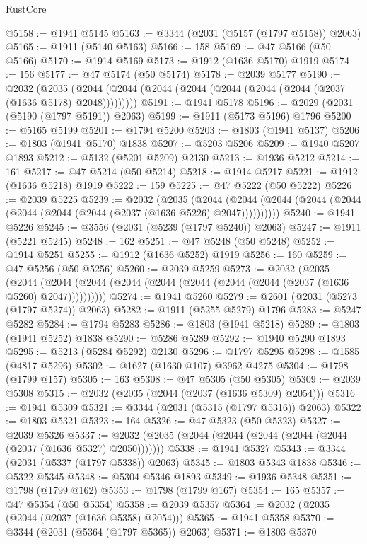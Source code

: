\begin{lexlean}{RustCore}
\begin{coremodule}
@5158 := @1941 @5145
@5163 := @3344 (@2031 (@5157 (@1797 @5158)) @2063)
@5165 := @1911 (@5140 @5163)
@5166 := 158
@5169 := @47 @5166 (@50 @5166)
@5170 := @1914 @5169
@5173 := @1912 (@1636 @5170) @1919
@5174 := 156
@5177 := @47 @5174 (@50 @5174)
@5178 := @2039 @5177
@5190 := @2032
    (@2035 (@2044 (@2044 (@2044 (@2044 (@2044 (@2044 (@2044 (@2037 (@1636 @5178) @2048)))))))))
@5191 := @1941 @5178
@5196 := @2029 (@2031 (@5190 (@1797 @5191)) @2063)
@5199 := @1911 (@5173 @5196) @1796
@5200 := @5165 @5199
@5201 := @1794 @5200
@5203 := @1803 (@1941 @5137)
@5206 := @1803 (@1941 @5170) @1838
@5207 := @5203 @5206
@5209 := @1940 @5207 @1893
@5212 := @5132 (@5201 @5209) @2130
@5213 := @1936 @5212
@5214 := 161
@5217 := @47 @5214 (@50 @5214)
@5218 := @1914 @5217
@5221 := @1912 (@1636 @5218) @1919
@5222 := 159
@5225 := @47 @5222 (@50 @5222)
@5226 := @2039 @5225
@5239 := @2032
    (@2035
      (@2044 (@2044 (@2044 (@2044 (@2044 (@2044 (@2044 (@2044 (@2037 (@1636 @5226) @2047))))))))))
@5240 := @1941 @5226
@5245 := @3556 (@2031 (@5239 (@1797 @5240)) @2063)
@5247 := @1911 (@5221 @5245)
@5248 := 162
@5251 := @47 @5248 (@50 @5248)
@5252 := @1914 @5251
@5255 := @1912 (@1636 @5252) @1919
@5256 := 160
@5259 := @47 @5256 (@50 @5256)
@5260 := @2039 @5259
@5273 := @2032
    (@2035
      (@2044 (@2044 (@2044 (@2044 (@2044 (@2044 (@2044 (@2044 (@2037 (@1636 @5260) @2047))))))))))
@5274 := @1941 @5260
@5279 := @2601 (@2031 (@5273 (@1797 @5274)) @2063)
@5282 := @1911 (@5255 @5279) @1796
@5283 := @5247 @5282
@5284 := @1794 @5283
@5286 := @1803 (@1941 @5218)
@5289 := @1803 (@1941 @5252) @1838
@5290 := @5286 @5289
@5292 := @1940 @5290 @1893
@5295 := @5213 (@5284 @5292) @2130
@5296 := @1797 @5295
@5298 := @1585 (@4817 @5296)
@5302 := @1627 (@1630 @107) @3962 @4275
@5304 := @1798 (@1799 @157)
@5305 := 163
@5308 := @47 @5305 (@50 @5305)
@5309 := @2039 @5308
@5315 := @2032 (@2035 (@2044 (@2037 (@1636 @5309) @2054)))
@5316 := @1941 @5309
@5321 := @3344 (@2031 (@5315 (@1797 @5316)) @2063)
@5322 := @1803 @5321
@5323 := 164
@5326 := @47 @5323 (@50 @5323)
@5327 := @2039 @5326
@5337 := @2032 (@2035 (@2044 (@2044 (@2044 (@2044 (@2044 (@2037 (@1636 @5327) @2050)))))))
@5338 := @1941 @5327
@5343 := @3344 (@2031 (@5337 (@1797 @5338)) @2063)
@5345 := @1803 @5343 @1838
@5346 := @5322 @5345
@5348 := @5304 @5346 @1893
@5349 := @1936 @5348
@5351 := @1798 (@1799 @162)
@5353 := @1798 (@1799 @167)
@5354 := 165
@5357 := @47 @5354 (@50 @5354)
@5358 := @2039 @5357
@5364 := @2032 (@2035 (@2044 (@2037 (@1636 @5358) @2054)))
@5365 := @1941 @5358
@5370 := @3344 (@2031 (@5364 (@1797 @5365)) @2063)
@5371 := @1803 @5370

\end{coremodule}
\end{lexlean}
